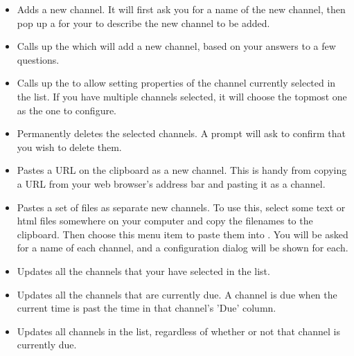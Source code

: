\begin{itemize}
  \item {} Adds a new channel. It 
  will first ask you for a name of the new channel, then pop up a 
  \helpignore{\ref{sec:pd-channel-dialog}}
   for your to describe
  the new channel to be added.
  
  \item {} 
  Calls up the
  \helpignore{\ref{sec:pd-add-channel-wizard}}
  which will add a new channel, based on your answers to a few questions.
 
  \item {} Calls up the
  \helpignore{\ref{sec:pd-channel-dialog}}
  to allow setting properties of the channel currently selected in the list.
  If you have multiple channels selected, it will choose the topmost one as 
  the one to configure.

  \item {} Permanently 
  deletes the selected channels. A prompt will ask to confirm that you wish to 
  delete them.
\end{itemize}

\begin{itemize}
  \item {} Pastes
  a URL on the clipboard as a new channel. This is handy from copying a URL
  from your web browser's address bar and pasting it as a \brandingapplicationsuitename channel.
  
  \item {}
  Pastes a set of files as separate new channels. To use this, select some 
  text or html files somewhere on your computer and copy the filenames 
  to the clipboard. Then choose this menu item to paste them into 
  \brandingapplicationdesktopname. 
  You will be asked for a name of each channel, and a configuration
  dialog will be shown for each. 
\end{itemize}

\begin{itemize}
  \item {} Updates all the 
  channels that your have selected in the list.

  \item {} Updates all the 
  channels that are currently due. A channel is due when the current time is 
  past the time in that channel's 'Due' column.

  \item {} Updates all channels in 
  the list, regardless of whether or not that channel is currently due.
\end{itemize}


